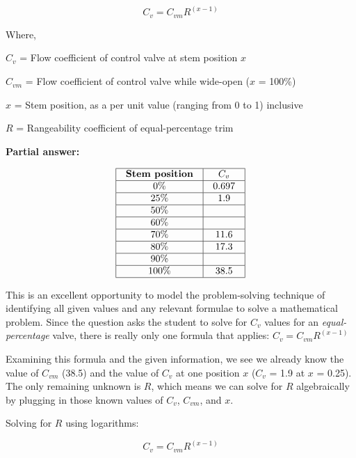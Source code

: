 $$C_v = C_{vm} R^{(x - 1)}$$

\noindent
Where,

$C_v$ = Flow coefficient of control valve at stem position $x$

$C_{vm}$ = Flow coefficient of control valve while wide-open ($x$ = 100\%)

$x$ = Stem position, as a per unit value (ranging from 0 to 1) inclusive

$R$ = Rangeability coefficient of equal-percentage trim

\vskip 10pt

\noindent
{\bf Partial answer:}


$$\vbox{\offinterlineskip
\halign{\strut
\vrule \quad\hfil # \ \hfil & 
\vrule \quad\hfil # \ \hfil \vrule \cr
\noalign{\hrule}
%
{\bf Stem position} & $C_v$ \cr
%
\noalign{\hrule}
%
0\% & 0.697 \cr
%
\noalign{\hrule}
%
25\% & 1.9 \cr
%
\noalign{\hrule}
%
50\% &  \cr
%
\noalign{\hrule}
%
60\% &  \cr
%
\noalign{\hrule}
%
70\% & 11.6 \cr
%
\noalign{\hrule}
%
80\% & 17.3 \cr
%
\noalign{\hrule}
%
90\% &  \cr
%
\noalign{\hrule}
%
100\% & 38.5 \cr
%
\noalign{\hrule}
} %
}$$ %







This is an excellent opportunity to model the problem-solving technique of identifying all given values and any relevant formulae to solve a mathematical problem.  Since the question asks the student to solve for $C_v$ values for an {\it equal-percentage} valve, there is really only one formula that applies: $C_v = C_{vm} R^{(x - 1)}$

Examining this formula and the given information, we see we already know the value of $C_{vm}$ (38.5) and the value of $C_v$ at one position $x$ ($C_v$ = 1.9 at $x$ = 0.25).  The only remaining unknown is $R$, which means we can solve for $R$ algebraically by plugging in those known values of $C_v$, $C_{vm}$, and $x$.

\vskip 10pt

Solving for $R$ using logarithms:

$$C_v = C_{vm} R^{(x - 1)}$$

